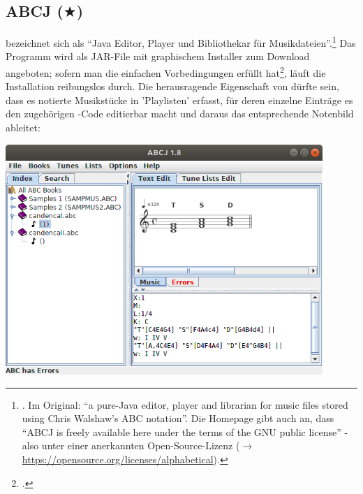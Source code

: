 %
%
%



\subsection{ABCJ ($\bigstar$)}

\label{ABCJ} bezeichnet sich als \enquote{Java Editor, Player und
Bibliothekar für Musikdateien}.\footnote{\cite[vgl.][\nopage wp]{Spencer2019a}.
Im Original: \enquote{a pure-Java editor, player and librarian for music files
stored using Chris Walshaw's ABC notation}. Die Homepage gibt auch an, dass
\enquote{ABCJ is freely available here under the terms of the GNU public
license} - also unter einer anerkannten Open-Source-Lizenz ($\rightarrow$
\href{https://opensource.org/licenses/alphabetical}
{https://opensource.org/licenses/alphabetical}).} Das Programm wird als JAR-File
mit graphischem Installer zum Download angeboten; sofern man die einfachen
Vorbedingungen erfüllt hat\footcite[vgl.][\nopage wp]{Spencer2019a}, läuft die
Installation reibungslos durch. Die herausragende Eigenschaft von 
dürfte sein, dass es  notierte Musikstücke in 'Playlisten' erfasst, für
deren einzelne Einträge es den zugehörigen -Code editierbar macht und
daraus  das entsprechende Notenbild ableitet:

\begin{center}
\includegraphics[width=0.9\textwidth]{frontends/abcj/abcj-cadenca1-300dpi.png}
\end{center}

